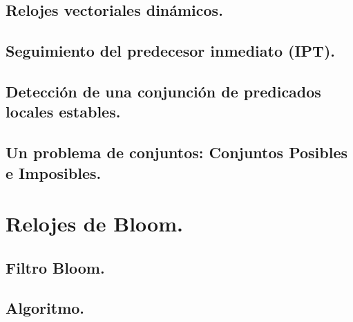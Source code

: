 \documentclass[9pt]{beamer}
\begin{document}
\subsection{Relojes vectoriales dinámicos.}   %



\subsection{Seguimiento del predecesor inmediato (IPT).}





\subsection{Detección de una conjunción de predicados locales estables.}


\subsection{Un problema de conjuntos: Conjuntos Posibles e Imposibles.}



\section{Relojes de Bloom.}
\subsection{Filtro Bloom.}



\subsection{Algoritmo.}



\end{document}

